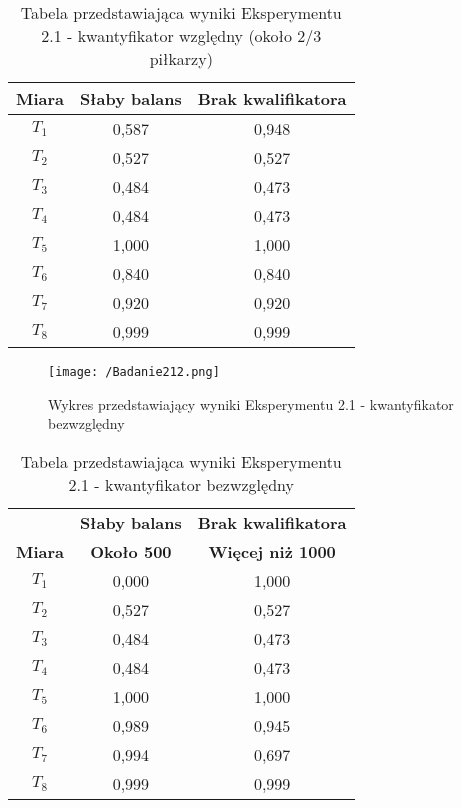 \documentclass{classrep}
\begin{document}
\begin{table}[H]
	\centering
	\begin{tabular}{c c c} 
		\hline
		\textbf{Miara} & \textbf{Słaby balans} & \textbf{Brak kwalifikatora}\\ [0.5ex] 
		\hline
		\hline 
        $T_1$ & 0,587 & 0,948\\
        $T_2$ & 0,527 & 0,527\\
        $T_3$ & 0,484 & 0,473\\
        $T_4$ & 0,484 & 0,473\\
        $T_5$ & 1,000 & 1,000\\
        $T_6$ & 0,840 & 0,840\\
        $T_7$ & 0,920 & 0,920\\
        $T_8$ & 0,999 & 0,999\\
		\hline
	\end{tabular}
	\caption{Tabela przedstawiająca wyniki Eksperymentu 2.1 - kwantyfikator względny (około 2/3 piłkarzy)}
\end{table}

\begin{figure}[H]
	\centering
	\texttt{[image: /Badanie212.png]}
	\caption{Wykres przedstawiający wyniki Eksperymentu 2.1 - kwantyfikator bezwzględny}
\end{figure}

\begin{table}[H]
	\centering
	\begin{tabular}{c c c } 
		\hline
		& \textbf{Słaby balans} & \textbf{Brak kwalifikatora}\\ [0.5ex]
		\textbf{Miara} & \textbf{Około 500} & \textbf{Więcej niż 1000}\\ [0.5ex]
		\hline
		\hline 
        $T_1$ & 0,000 & 1,000\\
        $T_2$ & 0,527 & 0,527\\
        $T_3$ & 0,484 & 0,473\\
        $T_4$ & 0,484 & 0,473\\
        $T_5$ & 1,000 & 1,000\\
        $T_6$ & 0,989 & 0,945\\
        $T_7$ & 0,994 & 0,697\\
        $T_8$ & 0,999 & 0,999\\
		\hline
	\end{tabular}
	\caption{Tabela przedstawiająca wyniki Eksperymentu 2.1 - kwantyfikator bezwzględny}
\end{table}
\end{document}

